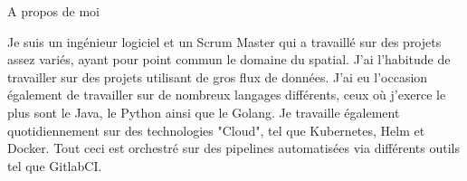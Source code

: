 \documentclass[
	11pt, %
]{resume} %
\begin{document}

\begin{rSection}{A propos de moi}
 
	Je suis un ingénieur logiciel et un Scrum Master qui a travaillé sur des projets assez variés, ayant pour point commun le domaine du spatial. 
	J'ai l'habitude de travailler sur des projets utilisant de gros flux de données. 
	J'ai eu l'occasion également de travailler sur de nombreux langages différents, ceux où j'exerce le plus sont le Java, le Python ainsi que le Golang. 
	Je travaille également quotidiennement sur des technologies "Cloud", tel que Kubernetes, Helm et Docker. 
	Tout ceci est orchestré sur des pipelines automatisées via différents outils tel que GitlabCI. 

\end{rSection}
\end{document}

